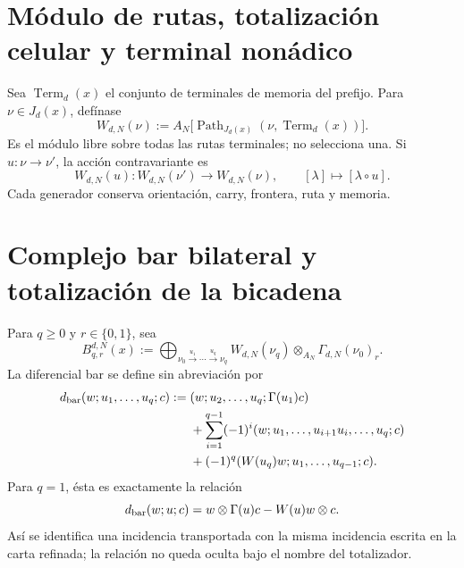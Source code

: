 \fi
\section{Módulo de rutas, totalización celular y terminal nonádico}
\label{sec:pdfv2-coh-route-module}

Sea \(\operatorname{Term}_d(x)\) el conjunto de terminales de memoria del
prefijo. Para \(\nu\in J_d(x)\), defínase
\begin{equation}\label{eq:pdfv2-coh-w-module}
 W_{d,N}(\nu):=
 A_N\bigl[
 \operatorname{Path}_{J_d(x)}(\nu,\operatorname{Term}_d(x))
 \bigr].
\end{equation}
Es el módulo libre sobre todas las rutas terminales; no selecciona una. Si
\(u:\nu\to\nu'\), la acción contravariante es
\begin{equation}\label{eq:pdfv2-coh-w-action}
 W_{d,N}(u):W_{d,N}(\nu')\longrightarrow W_{d,N}(\nu),
 \qquad
 [\lambda]\longmapsto[\lambda\circ u].
\end{equation}
Cada generador conserva orientación, carry, frontera, ruta y memoria.

\section{Complejo bar bilateral y totalización de la bicadena}
\label{sec:pdfv2-coh-bar}

Para \(q\geq0\) y \(r\in\{0,1\}\), sea
\begin{equation}\label{eq:pdfv2-coh-bar-bigraded}
 B_{q,r}^{d,N}(x):=
 \bigoplus_{\nu_0\xrightarrow{u_1}\cdots\xrightarrow{u_q}\nu_q}
 W_{d,N}(\nu_q)\otimes_{A_N}\Gamma_{d,N}(\nu_0)_r.
\end{equation}
La diferencial bar se define sin abreviación por
\begin{align}
 d_{\rm bar}(w;u_1,\ldots,u_q;c)
 :={}&(w;u_2,\ldots,u_q;\Gamma(u_1)c)
 \nonumber\\
 &+\sum_{i=1}^{q-1}(-1)^i
 (w;u_1,\ldots,u_{i+1}u_i,\ldots,u_q;c)
 \nonumber\\
 &+(-1)^q
 (W(u_q)w;u_1,\ldots,u_{q-1};c).
 \label{eq:pdfv2-coh-bar-differential}
\end{align}
Para \(q=1\), ésta es exactamente la relación
\begin{equation}\label{eq:pdfv2-coh-coend-relation}
 d_{\rm bar}(w;u;c)
 =w\otimes\Gamma(u)c-W(u)w\otimes c.
\end{equation}
Así se identifica una incidencia transportada con la misma incidencia escrita
en la carta refinada; la relación no queda oculta bajo el nombre del
totalizador.

